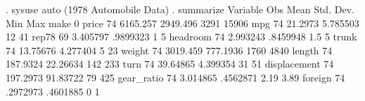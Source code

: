 . sysuse auto
(1978 Automobile Data)
{\smallskip}
. summarize
{\smallskip}
    Variable {\VBAR}        Obs        Mean    Std. Dev.       Min        Max
        make {\VBAR}          0
       price {\VBAR}         74    6165.257    2949.496       3291      15906
         mpg {\VBAR}         74     21.2973    5.785503         12         41
       rep78 {\VBAR}         69    3.405797    .9899323          1          5
    headroom {\VBAR}         74    2.993243    .8459948        1.5          5
       trunk {\VBAR}         74    13.75676    4.277404          5         23
      weight {\VBAR}         74    3019.459    777.1936       1760       4840
      length {\VBAR}         74    187.9324    22.26634        142        233
        turn {\VBAR}         74    39.64865    4.399354         31         51
displacement {\VBAR}         74    197.2973    91.83722         79        425
  gear_ratio {\VBAR}         74    3.014865    .4562871       2.19       3.89
     foreign {\VBAR}         74    .2972973    .4601885          0          1
{\smallskip}
